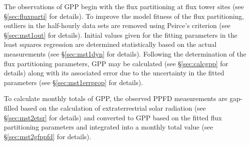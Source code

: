The observations of GPP begin with the flux partitioning at flux tower sites (see \S \ref{sec:fluxparti} for details).
To improve the model fitness of the flux partitioning, outliers in the half-hourly data sets are removed using Peirce's criterion (see \S \ref{sec:mst1out} for details). 
Initial values given for the fitting parameters in the least squares regression are determined statistically based on the actual measurements (see \S \ref{sec:mst1dyn} for details).
Following the determination of the flux partitioning parameters, GPP may be calculated (see \S \ref{sec:calcgpp} for details) along with its associated error due to the uncertainty in the fitted parameters (see \S \ref{sec:mst1errprop} for details).

To calculate monthly totals of GPP, the observed PPFD measurements are gap-filled  based on the calculation of extraterrestrial solar radiation (see \S \ref{sec:mst2etsr} for details) and converted to GPP based on the fitted flux partitioning parameters and integrated into a monthly total value (see \S \ref{sec:mst2gfppfd} for details). 

